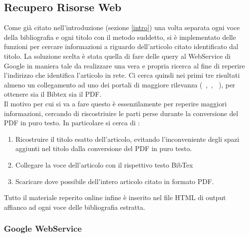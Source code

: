 \subsection{Recupero Risorse Web}

Come già citato nell'introduzione (sezione \ref{intro}) una volta separata ogni voce della bibliografia e ogni titolo con il metodo suddetto, si è implementato delle funzioni per cercare informazioni a riguardo dell'articolo citato identificato dal titolo. La soluzione scelta è stata quella di fare delle query al WebService di Google in maniera tale da realizzare una vera e propria ricerca al fine di reperire l'indirizzo che identifica l'articolo in rete. Ci cerca quindi nei primi tre risultati almeno un collegamento ad uno dei portali di maggiore rilevanza (~,~,~ ), per ottenere sia il Bibtex sia il PDF.\\
Il motivo per cui si va a fare questo è essenzilamente per reperire maggiori informazioni, cercando di riscostriuire le parti perse durante la conversione del PDF in puro testo. In particolare si cerca di :
\begin{enumerate}
	\item Ricostruire il titolo esatto dell'articolo, evitando l'inconveniente degli spazi aggiunti nel titolo dalla conversione del PDF in puro testo.
	\item Collegare la voce dell'articolo con il rispettivo testo BibTex
	\item Scaricare dove possibile dell'intero articolo citato in formato PDF.
\end{enumerate}

Tutto il materiale reperito online infine è inserito nel file HTML di output affianco ad ogni voce delle bibliografia estratta.\\

\subsubsection{Google WebService}


